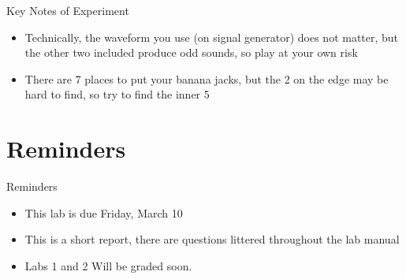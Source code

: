 \documentclass{beamer}
\begin{document}
\begin{frame}{Key Notes of Experiment}
  \begin{itemize}
  \item Technically, the waveform you use (on signal generator) does not matter, but the other two included produce odd sounds, so play at your own risk
  \item There are 7 places to put your banana jacks, but the 2 on the edge may be hard to find, so try to find the inner 5
  \end{itemize}
\end{frame}

\section{Reminders}
\begin{frame}{Reminders}
  \begin{itemize}
  \item This lab is due Friday, March 10
  \item This is a short report, there are questions littered throughout the lab manual
  \item Labs 1 and 2 Will be graded soon.
  \end{itemize}
\end{frame}
\end{document}
